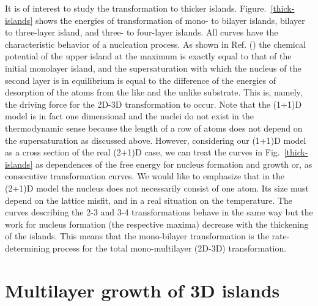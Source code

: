 \documentclass[aps,prl,showpacs,twocolumn,byrevtex,floatfix]{revtex4-1}
\begin{document}
It is of interest to study the transformation to thicker islands. Figure.\
\ref{thick-islands} shows the energies of transformation of mono- to bilayer
islands, bilayer to three-layer island, and three- to four-layer islands. All
curves have the characteristic behavior of a nucleation process. As shown in
Ref. (\onlinecite{Stoyanov82}) the chemical potential of the upper island at the
maximum is exactly equal to that of the initial monolayer island, and the
supersaturation with which the nucleus of the second layer is in equilibrium is
equal to the difference of the energies of desorption of the atoms from the like
and the unlike substrate. This is, namely, the
driving force for the 2D-3D transformation to occur. Note that the (1+1)D model
is in fact one dimensional and the nuclei do not exist in the thermodynamic
sense because the length of a row of atoms does not depend on the
supersaturation as discussed above.\cite{Voronkov70,Frank74,Zhang90} However,
considering our (1+1)D model as a cross section of the real (2+1)D case, we can
treat the curves in Fig.\ \ref{thick-islands} as dependences of the free
energy for nucleus formation and growth or, as consecutive transformation
curves. We would like to emphasize that in the (2+1)D model the nucleus does not
necessarily consist of one atom. Its size must depend on the lattice misfit,
and in a real situation on the temperature. The curves describing the 2-3 and
3-4 transformations behave in the same way but the work for nucleus formation
(the respective maxima) decrease with the thickening of the islands.
This means that the mono-bilayer transformation is the rate-determining
process for the total mono-multilayer (2D-3D) transformation.


\section{Multilayer growth of 3D islands}
\end{document}
